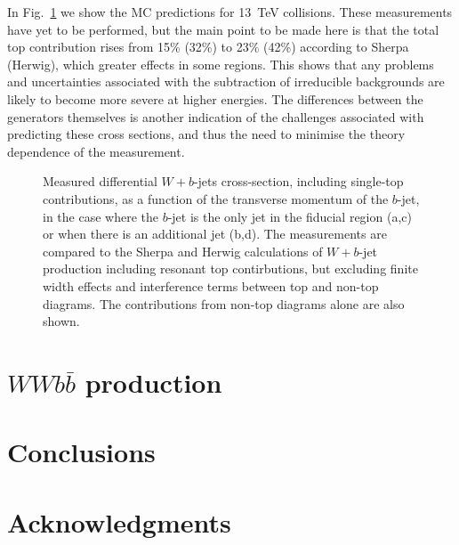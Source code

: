 \documentclass[floatfix]{article}
\begin{document}
In Fig.~\ref{fig:13tev} we show the MC predictions for 13~TeV collisions. These measurements have yet to be performed, but the main point to be made here is that
the total top contribution rises from 15\% (32\%) to 23\% (42\%) according to Sherpa (Herwig), which greater effects in some regions. 
This shows that any problems and uncertainties associated with the
subtraction of irreducible backgrounds are likely to become more severe at higher energies. The differences between the generators themselves is another indication of the 
challenges associated with predicting these cross sections, and thus the need to minimise the theory dependence of the measurement.
  
\begin{figure}%
\centering
{}
\caption{\label{fig:13tev}
Measured differential $W+b$-jets cross-section, including single-top contributions, as a function of the transverse momentum of the $b$-jet, 
in the case where the $b$-jet is the only jet in the fiducial region (a,c) or when there is an additional jet (b,d). 
The measurements are compared to the Sherpa and Herwig calculations of $W+b$-jet production including resonant top contirbutions, but excluding finite width effects 
and interference terms between top and non-top diagrams. The contributions from non-top diagrams alone are also shown.}
\end{figure}



\section{$WWb\bar{b}$ production}

\section{Conclusions}\label{sec:conclusions}

\section*{Acknowledgments}




\end{document}
